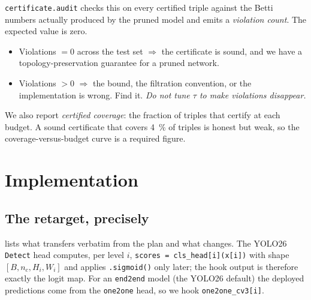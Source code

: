 \documentclass[11pt]{article}
\newcommand{\code}[1]{\texttt{\small #1}}
\theoremstyle{definition}
\theoremstyle{plain}
\begin{document}
\code{certificate.audit} checks this on every certified triple against the Betti
numbers actually produced by the pruned model and emits a \emph{violation count}.
The expected value is zero.
\begin{itemize}[leftmargin=1.5em]
\item Violations $= 0$ across the test set $\Rightarrow$ the certificate is sound,
and we have a topology-preservation guarantee for a pruned network.
\item Violations $> 0$ $\Rightarrow$ the bound, the filtration convention, or the
implementation is wrong. Find it. \emph{Do not tune $\tau$ to make violations
disappear.}
\end{itemize}
We also report \emph{certified coverage}: the fraction of triples that certify at
each budget. A sound certificate that covers \SI{4}{\percent} of triples is
honest but weak, so the coverage-versus-budget curve is a required figure.

\section{Implementation}
\label{sec:impl}

\subsection{The retarget, precisely}
\label{sec:retarget}

 lists what transfers verbatim from the plan and what changes.
The YOLO26 \code{Detect} head computes, per level $i$,
\code{scores = cls\_head[i](x[i])} with shape $[B, n_c, H_i, W_i]$ and applies
\code{.sigmoid()} only later; the hook output is therefore exactly the logit map.
For an \code{end2end} model (the YOLO26 default) the deployed predictions come
from the \code{one2one} head, so we hook \code{one2one\_cv3[i]}.
\end{document}

